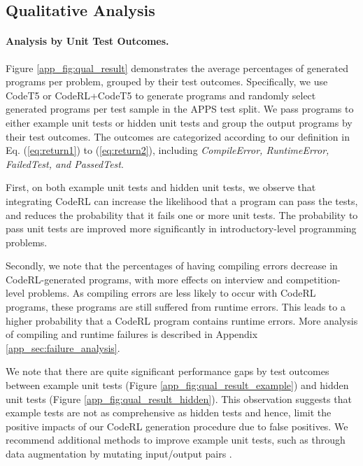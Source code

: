 \documentclass{article}
\begin{document}
\subsection{Qualitative Analysis}

\paragraph{Analysis by Unit Test Outcomes.}
Figure \ref{app_fig:qual_result} demonstrates the average percentages of generated programs per problem, grouped by their test outcomes.
Specifically, we use CodeT5 or CodeRL+CodeT5 to generate programs and randomly select  generated programs per test sample in the APPS test split.
We pass programs to either example unit tests or hidden unit tests and group the output programs by their test outcomes.
The outcomes are categorized according to our definition in Eq. (\ref{eq:return1}) to (\ref{eq:return2}), including \emph{CompileError, RuntimeError, FailedTest, and PassedTest}. 

First, on both example unit tests and hidden unit tests, we observe that integrating CodeRL can increase the likelihood that a program can pass the tests, and reduces the probability that it fails one or more unit tests.
The probability to pass unit tests are improved more significantly in introductory-level programming problems. 

Secondly, we note that the percentages of having compiling errors decrease in CodeRL-generated programs, with more effects on interview and competition-level problems. 
As compiling errors are less likely to occur with CodeRL programs, these programs are still suffered from runtime errors.
This leads to a higher probability that a CodeRL program contains runtime errors. 
More analysis of compiling and runtime failures is described in Appendix \ref{app_sec:failure_analysis}. 

We note that there are quite significant performance gaps by test outcomes between example unit tests (Figure \ref{app_fig:qual_result_example}) and hidden unit tests (Figure \ref{app_fig:qual_result_hidden}).
This observation suggests that example tests are not as comprehensive as hidden tests and hence, limit the positive impacts of our CodeRL generation procedure due to false positives. 
We recommend additional methods to improve example unit tests, such as through data augmentation by mutating input/output pairs \citep{austin2021program}.
\end{document}
